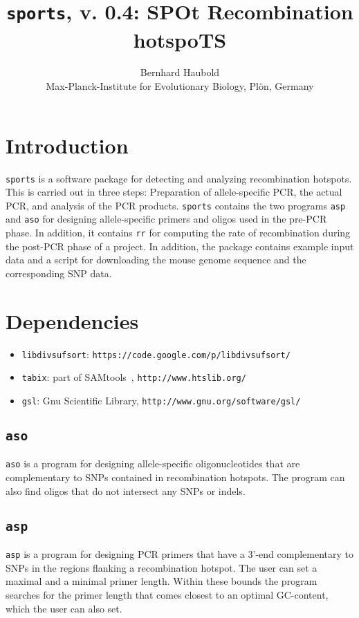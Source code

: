 \documentclass{article}
\newcommand{\bi}{\begin{itemize}}
\newcommand{\ei}{\end{itemize}}
\newcommand{\I}{\item}
\newcommand{\ty}{\texttt}
\newcommand{\version}{0.4}
\begin{document}
\title{\ty{sports}, v. \version: SPOt Recombination hotspoTS}
\author{Bernhard Haubold\\\small Max-Planck-Institute for Evolutionary Biology, Pl\"on, Germany}
\maketitle
\section{Introduction}
\ty{sports} is a software package for detecting and analyzing
recombination hotspots. This is carried out in three steps:
Preparation of allele-specific PCR, the actual PCR, and analysis of
the PCR products. \ty{sports} contains the two programs \ty{asp} and \ty{aso} for designing
allele-specific primers and oligos used in the pre-PCR phase. In
addition, it contains \ty{rr} for computing the rate of recombination
during the post-PCR phase of a project. In addition, the package
contains example input data and a script for downloading the mouse
genome sequence and the corresponding SNP data.

\section{Dependencies}
\bi
\I \ty{libdivsufsort}: \ty{https://code.google.com/p/libdivsufsort/}
\I \ty{tabix}: part of SAMtools~\cite{li09:seq},
\ty{http://www.htslib.org/}
\I \ty{gsl}: Gnu Scientific Library, \ty{http://www.gnu.org/software/gsl/}
\ei

\subsection{\ty{aso}}
\ty{aso} is a program for designing allele-specific oligonucleotides that are
complementary to SNPs contained in recombination hotspots. The program
can also find oligos that do not intersect any SNPs or indels. 

\subsection{\ty{asp}}
\ty{asp} is a program for designing PCR primers that have a 3'-end
complementary to SNPs in the regions flanking a recombination
hotspot. The user can set a maximal and a minimal primer
length. Within these bounds the program searches for the primer length
that comes closest to an optimal GC-content, which the user can also
set.
\end{document}
